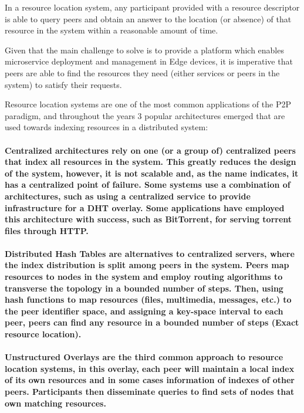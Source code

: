 



In a resource location system, any participant provided with a resource descriptor is able to query peers and obtain an answer to the location (or absence) of that resource in the system within a reasonable amount of time. 

Given that the main challenge to solve is to provide a platform which enables microservice deployment and management in Edge devices, it is imperative that peers are able to find the resources they need (either services or peers in the system) to satisfy their requests. 

Resource location systems are one of the most common applications of the P2P paradigm, and throughout the years 3 popular architectures emerged that are used towards indexing resources in a distributed system:

\paragraph{ \textbf{Centralized} architectures rely on one (or a group of) centralized peers that index all resources in the system. This greatly reduces the design of the system, however, it is not scalable and, as the name indicates, it has a centralized point of failure. Some systems use a combination of architectures, such as using a centralized service to provide infrastructure for a DHT overlay. Some applications have employed this architecture with success, such as BitTorrent, for serving torrent files through HTTP.
}

\paragraph{ \textbf{Distributed Hash Tables} are alternatives to centralized servers, where the index distribution is split among peers in the system. Peers map resources to nodes in the system and employ routing algorithms to transverse the topology in a bounded number of steps. Then, using hash functions to map resources (files, multimedia, messages, etc.) to the peer identifier space, and assigning a key-space interval to each peer, peers can find any resource in a bounded number of steps (Exact resource location).}

\paragraph{ \textbf{Unstructured Overlays} are the third common approach to resource location systems, in this overlay, each peer will maintain a local index of its own resources and in some cases information of indexes of other peers. Participants then disseminate queries to find sets of nodes that own matching resources.}

